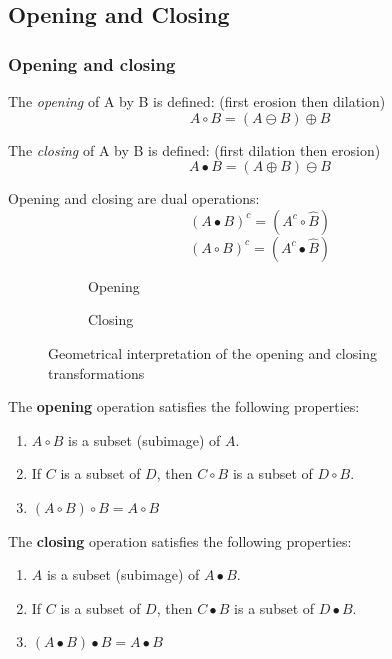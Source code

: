 \subsection{Opening and Closing}
\subsubsection{Opening and closing}
The \emph{opening} of A by B is defined: (first erosion then dilation)
\[
	A \circ B = (A \ominus B) \oplus B
\]

The \emph{closing} of A by B is defined: (first dilation then erosion)
\[
	A  \bullet B = (A \oplus B) \ominus B
\]

Opening and closing are dual operations:
\[
	(A  \bullet B)^c = (A^c \circ \hat{B})
\]
\[
	(A \circ B)^c = (A^c \bullet \hat{B})
\]

\begin{figure}[h!]
	\centering
	\begin{subfigure}[b]{0.45\textwidth}
		\centering
		\caption{Opening}
	\end{subfigure}
	\begin{subfigure}[b]{0.45\textwidth}
		\centering
		\caption{Closing}
	\end{subfigure}
	\caption{Geometrical interpretation of the opening and closing transformations}
\end{figure}

The \textbf{opening} operation satisfies the following properties:
\begin{enumerate}[label=\textbf{(\alph*)}]
	\item $A \circ B$ is a subset (subimage) of $A$.
	\item If $C$ is a subset of $D$, then $C \circ B$ is a subset of $D \circ B$.
	\item $(A \circ B) \circ B = A \circ B$
\end{enumerate}

The \textbf{closing} operation satisfies the following properties:
\begin{enumerate}[label=\textbf{(\alph*)}]
	\item $A$ is a subset (subimage) of $A \bullet B$.
	\item If $C$ is a subset of $D$, then $C \bullet B$ is a subset of $D \bullet B$.
	\item $(A \bullet B) \bullet B = A \bullet B$
\end{enumerate}


